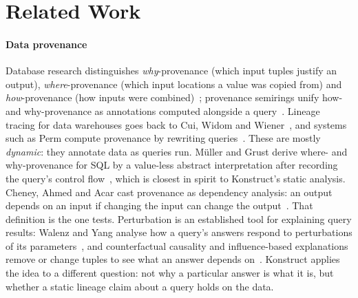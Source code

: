 \section{Related Work}
\label{sec:related}

\paragraph{Data provenance}
Database research distinguishes \emph{why}-provenance (which input tuples justify an output),
\emph{where}-provenance (which input locations a value was copied from) and
\emph{how}-provenance (how inputs were combined)~\citep{buneman2001why,cheney2009provenance};
provenance semirings unify how- and why-provenance as annotations computed alongside a
query~\citep{green2007semirings}. Lineage tracing for data warehouses goes back to Cui, Widom and
Wiener~\citep{cui2000tracing,cui2003lineage}, and systems such as Perm compute provenance by
rewriting queries~\citep{glavic2009perm}. These are mostly \emph{dynamic}: they annotate data as
queries run. Müller and Grust derive where- and why-provenance for SQL by a value-less abstract
interpretation after recording the query's control flow~\citep{muller2015abstract}, which is
closest in spirit to Konstruct's static analysis. Cheney, Ahmed and Acar cast provenance as
dependency analysis: an output depends on an input if changing the input can change the
output~\citep{cheney2007dependency}. That definition is the one  tests.
Perturbation is an established tool for explaining query results: Walenz and Yang analyse how a
query's answers respond to perturbations of its parameters~\citep{walenz2016perturbation}, and
counterfactual causality and influence-based explanations remove or change tuples to see what an
answer depends on~\citep{meliou2010causality,wu2013scorpion}. Konstruct applies the idea to a
different question: not why a particular answer is what it is, but whether a static lineage claim
about a query holds on the data.

